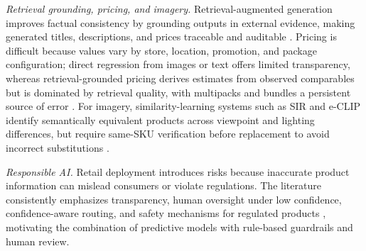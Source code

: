 \documentclass[conference]{IEEEtran}
\begin{document}
\textit{Retrieval grounding, pricing, and imagery.} Retrieval-augmented
generation improves factual consistency by grounding outputs in external
evidence, making generated titles, descriptions, and prices traceable and
auditable \cite{li2024modict}. Pricing is difficult because values vary by
store, location, promotion, and package configuration; direct regression from
images or text \cite{chen2018priceright} offers limited transparency, whereas
retrieval-grounded pricing derives estimates from observed comparables but is
dominated by retrieval quality, with multipacks and bundles a persistent source
of error \cite{llp2025}. For imagery, similarity-learning systems such as SIR
and e-CLIP identify semantically equivalent products across viewpoint and
lighting differences, but require same-SKU verification before replacement to
avoid incorrect substitutions \cite{sir2020,eclip2022}.

\textit{Responsible AI.} Retail deployment introduces risks because inaccurate
product information can mislead consumers or violate regulations. The literature
consistently emphasizes transparency, human oversight under low confidence,
confidence-aware routing, and safety mechanisms for regulated products
\cite{li2024modict}, motivating the combination of predictive models with
rule-based guardrails and human review.
\end{document}
